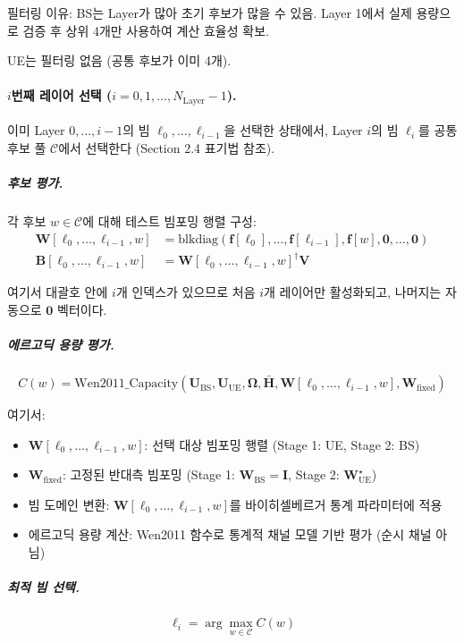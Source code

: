 \documentclass[10pt]{article}
\begin{document}
필터링 이유: BS는 Layer가 많아 초기 후보가 많을 수 있음. Layer 1에서 실제 용량으로 검증 후 상위 4개만 사용하여 계산 효율성 확보.

UE는 필터링 없음 (공통 후보가 이미 4개).

\paragraph{$i$번째 레이어 선택 ($i = 0, 1, \ldots, N_{\text{Layer}}-1$).}
이미 Layer $0, \ldots, i-1$의 빔 $\ell_0, \ldots, \ell_{i-1}$을 선택한 상태에서, Layer $i$의 빔 $\ell_i$를 공통 후보 풀 $\mathcal{C}$에서 선택한다 (Section 2.4 표기법 참조).

\subparagraph{후보 평가.}
각 후보 $w \in \mathcal{C}$에 대해 테스트 빔포밍 행렬 구성:
\begin{align}
\mathbf{W}[\ell_0, \ldots, \ell_{i-1}, w] &= \text{blkdiag}(\mathbf{f}[\ell_0], \ldots, \mathbf{f}[\ell_{i-1}], \mathbf{f}[w], \mathbf{0}, \ldots, \mathbf{0}) \\
\mathbf{B}[\ell_0, \ldots, \ell_{i-1}, w] &= \mathbf{W}[\ell_0, \ldots, \ell_{i-1}, w]^{\dagger} \mathbf{V}
\end{align}

여기서 대괄호 안에 $i$개 인덱스가 있으므로 처음 $i$개 레이어만 활성화되고, 나머지는 자동으로 $\mathbf{0}$ 벡터이다.

\subparagraph{에르고딕 용량 평가.}
\begin{equation}
C(w) = \text{Wen2011\_Capacity}(\mathbf{U}_{\text{BS}}, \mathbf{U}_{\text{UE}}, \boldsymbol{\Omega}, \bar{\mathbf{H}}, \mathbf{W}[\ell_0, \ldots, \ell_{i-1}, w], \mathbf{W}_{\text{fixed}})
\end{equation}

여기서:
\begin{itemize}
    \item $\mathbf{W}[\ell_0, \ldots, \ell_{i-1}, w]$: 선택 대상 빔포밍 행렬 (Stage 1: UE, Stage 2: BS)
    \item $\mathbf{W}_{\text{fixed}}$: 고정된 반대측 빔포밍 (Stage 1: $\mathbf{W}_{\text{BS}} = \mathbf{I}$, Stage 2: $\mathbf{W}_{\text{UE}}^{\star}$)
    \item 빔 도메인 변환: $\mathbf{W}[\ell_0, \ldots, \ell_{i-1}, w]$를 바이히셀베르거 통계 파라미터에 적용
    \item 에르고딕 용량 계산: Wen2011 함수로 통계적 채널 모델 기반 평가 (순시 채널 아님)
\end{itemize}

\subparagraph{최적 빔 선택.}
\begin{equation}
\ell_i = \arg\max_{w \in \mathcal{C}} C(w)
\end{equation}
\end{document}
